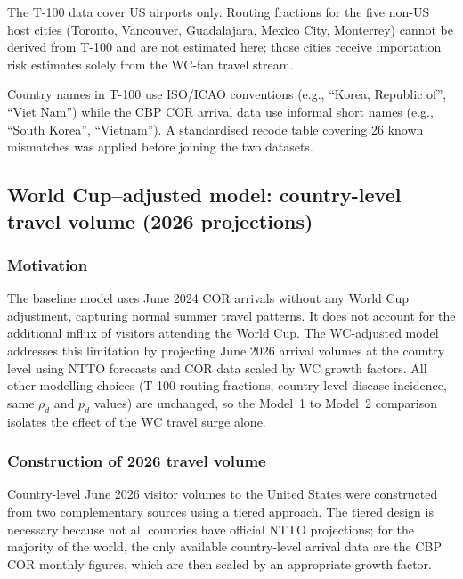 \documentclass[12pt]{article}
\begin{document}
The T-100 data cover US airports only. Routing fractions for the five
non-US host cities (Toronto, Vancouver, Guadalajara, Mexico City,
Monterrey) cannot be derived from T-100 and are not estimated here;
those cities receive importation risk estimates solely from the
WC-fan travel stream.

Country names in T-100 use ISO/ICAO conventions (e.g.,
``Korea, Republic of'', ``Viet Nam'') while the CBP COR arrival data
use informal short names (e.g., ``South Korea'', ``Vietnam''). A
standardised recode table covering 26 known mismatches was applied
before joining the two datasets.

\subsection*{World Cup--adjusted model: country-level travel
volume (2026 projections)}

\subsubsection*{Motivation}

The baseline model uses June 2024 COR arrivals without any World
Cup adjustment, capturing normal summer travel patterns. It does not
account for the additional influx of visitors attending the World Cup.
The WC-adjusted model addresses this limitation by projecting June
2026 arrival volumes at the country level using NTTO forecasts and
COR data scaled by WC growth factors. All other modelling choices
(T-100 routing fractions, country-level disease incidence, same
$\rho_d$ and $p_d$ values) are unchanged, so the Model~1 to Model~2
comparison isolates the effect of the WC travel surge alone.

\subsubsection*{Construction of 2026 travel volume}

Country-level June 2026 visitor volumes to the United States were
constructed from two complementary sources using a tiered approach.
The tiered design is necessary because not all countries have
official NTTO projections; for the majority of the world, the only
available country-level arrival data are the CBP COR monthly figures,
which are then scaled by an appropriate growth factor.
\end{document}
